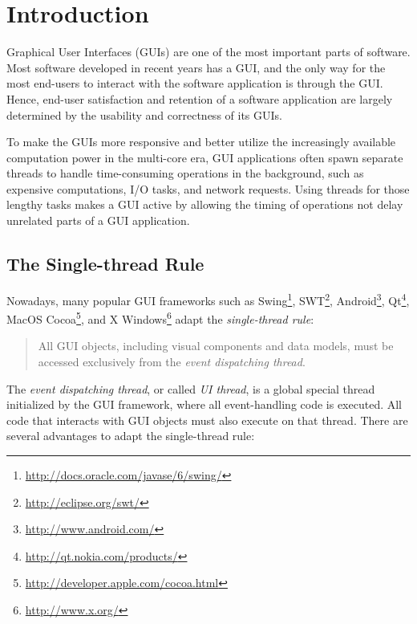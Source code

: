 \section{Introduction}

Graphical User Interfaces (GUIs) are one of the most important parts of
software. Most software developed in recent years has a GUI, and the only
way for the most end-users to interact with the software application is through
the GUI. Hence, end-user satisfaction and retention of a software application
 are largely determined by the usability and correctness of
its GUIs.

To make the GUIs more responsive and better utilize the increasingly available
computation power in the multi-core era, GUI applications often spawn separate
threads to handle time-consuming operations in the background, such as expensive
computations, I/O tasks, and network requests. Using threads for those lengthy tasks
makes a GUI active by allowing the timing of operations not delay unrelated parts of a 
GUI application.



\subsection{The Single-thread Rule}

Nowadays, many popular GUI frameworks such as Swing\footnote{\url{http://docs.oracle.com/javase/6/swing/}},
SWT\footnote{\url{http://eclipse.org/swt/}}, Android\footnote{\url{http://www.android.com/}},
Qt\footnote{\url{http://qt.nokia.com/products/}}, MacOS Cocoa\footnote{\url{http://developer.apple.com/cocoa.html}},
and X Windows\footnote{\url{http://www.x.org/}}
adapt the \textit{single-thread rule}:

\vspace{-2mm}

\begin{quote}
All GUI objects, including visual components and data models, must be
 accessed exclusively from the \textit{event dispatching thread}.
\end{quote}

\vspace{-2mm}

The \textit{event dispatching thread}, or called \textit{UI thread}, is a global special
thread initialized by the GUI framework, where all event-handling code
is executed. All code that interacts with GUI objects must also
execute on that thread.  There are several advantages to adapt the single-thread rule:

